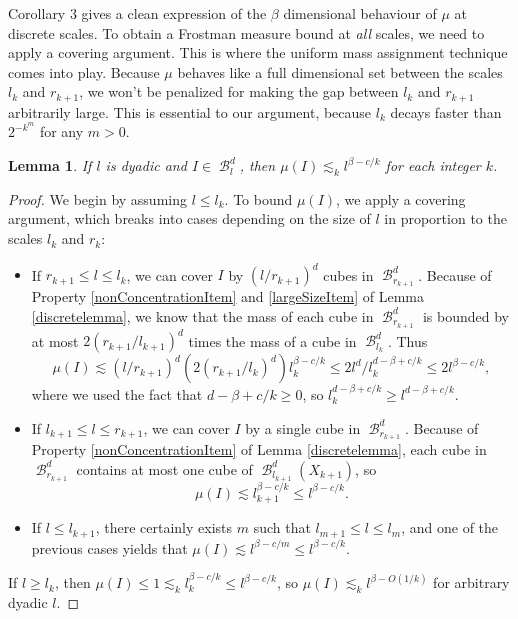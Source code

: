 \documentclass[dvipsnames,letterpaper,12pt]{article}
\numberwithin{equation}{section}
\theoremstyle{plain}
\newtheorem{lemma}{Lemma}
\DeclareMathOperator{\B}{\mathcal{B}}
\begin{document}
Corollary 3 gives a clean expression of the $\beta$ dimensional behaviour of $\mu$ at discrete scales. To obtain a Frostman measure bound at {\it all} scales, we need to apply a covering argument. This is where the uniform mass assignment technique comes into play. Because $\mu$ behaves like a full dimensional set between the scales $l_k$ and $r_{k+1}$, we won't be penalized for making the gap between $l_k$ and $r_{k+1}$ arbitrarily large. This is essential to our argument, because $l_k$ decays faster than $2^{-k^m}$ for any $m > 0$.

\begin{lemma} \label{frostmanBound}
	If $l$ is dyadic and $I \in \B_l^d$, then $\mu(I) \lesssim_k l^{\beta - c/k}$ for each integer $k$.
\end{lemma}
\begin{proof}
	We begin by assuming $l \leq l_k$. To bound $\mu(I)$, we apply a covering argument, which breaks into cases depending on the size of $l$ in proportion to the scales $l_k$ and $r_k$:
	\begin{itemize}
		\item If $r_{k+1} \leq l \leq l_k$, we can cover $I$ by $(l/r_{k+1})^d$ cubes in $\B^d_{r_{k+1}}$. Because of Property \ref{nonConcentrationItem} and \ref{largeSizeItem} of Lemma \ref{discretelemma}, we know that the mass of each cube in $\B^d_{r_{k+1}}$ is bounded by at most $2 (r_{k+1}/l_{k+1})^d$ times the mass of a cube in $\B_{l_k}^d$. Thus
		\[ \mu(I) \lesssim (l/r_{k+1})^d (2(r_{k+1}/l_k)^d) l_k^{\beta - c/k} \leq 2l^d/l_k^{d - \beta + c/k} \leq 2l^{\beta - c/k}, \]
		where we used the fact that $d - \beta + c/k \geq 0$, so $l_k^{d - \beta + c/k} \geq l^{d - \beta + c/k}$.

		\item If $l_{k+1} \leq l \leq r_{k+1}$, we can cover $I$ by a single cube in $\B^d_{r_{k+1}}$. Because of Property \ref{nonConcentrationItem} of Lemma \ref{discretelemma}, each cube in $\B^d_{r_{k+1}}$ contains at most one cube of $\B^d_{l_{k+1}}(X_{k+1})$, so
		\[ \mu(I) \lesssim l_{k+1}^{\beta - c/k} \leq l^{\beta - c/k}. \]

		\item If $l \leq l_{k+1}$, there certainly exists $m$ such that $l_{m+1} \leq l \leq l_m$, and one of the previous cases yields that $\mu(I) \lesssim l^{\beta - c/m} \leq l^{\beta - c/k}$.
	\end{itemize}
	If $l \geq l_k$, then $\mu(I) \leq 1 \lesssim_k l_k^{\beta - c/k} \leq l^{\beta - c/k}$, so $\mu(I) \lesssim_k l^{\beta - O(1/k)}$ for arbitrary dyadic $l$.
\end{proof}
\end{document}
